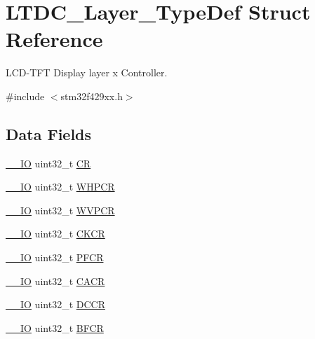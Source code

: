 \hypertarget{struct_l_t_d_c___layer___type_def}{}\section{L\+T\+D\+C\+\_\+\+Layer\+\_\+\+Type\+Def Struct Reference}
\label{struct_l_t_d_c___layer___type_def}


L\+C\+D-\/\+T\+FT Display layer x Controller.  




{\ttfamily \#include $<$stm32f429xx.\+h$>$}

\subsection*{Data Fields}
\begin{DoxyCompactItemize}
\item 
\hyperlink{core__sc300_8h_aec43007d9998a0a0e01faede4133d6be}{\+\_\+\+\_\+\+IO} uint32\+\_\+t \hyperlink{struct_l_t_d_c___layer___type_def_ab40c89c59391aaa9d9a8ec011dd0907a}{CR}
\item 
\hyperlink{core__sc300_8h_aec43007d9998a0a0e01faede4133d6be}{\+\_\+\+\_\+\+IO} uint32\+\_\+t \hyperlink{struct_l_t_d_c___layer___type_def_a36bded5d2b6b499385e45660f4a3c867}{W\+H\+P\+CR}
\item 
\hyperlink{core__sc300_8h_aec43007d9998a0a0e01faede4133d6be}{\+\_\+\+\_\+\+IO} uint32\+\_\+t \hyperlink{struct_l_t_d_c___layer___type_def_aafd5aea090b8ab4f7cbaee88503cb6a1}{W\+V\+P\+CR}
\item 
\hyperlink{core__sc300_8h_aec43007d9998a0a0e01faede4133d6be}{\+\_\+\+\_\+\+IO} uint32\+\_\+t \hyperlink{struct_l_t_d_c___layer___type_def_a7651be3d835a984e908b0abb4a633811}{C\+K\+CR}
\item 
\hyperlink{core__sc300_8h_aec43007d9998a0a0e01faede4133d6be}{\+\_\+\+\_\+\+IO} uint32\+\_\+t \hyperlink{struct_l_t_d_c___layer___type_def_a30f057fd86f8f793b6ab74bbe024b9d8}{P\+F\+CR}
\item 
\hyperlink{core__sc300_8h_aec43007d9998a0a0e01faede4133d6be}{\+\_\+\+\_\+\+IO} uint32\+\_\+t \hyperlink{struct_l_t_d_c___layer___type_def_a47be8b57cf19a433c0682d91a0524463}{C\+A\+CR}
\item 
\hyperlink{core__sc300_8h_aec43007d9998a0a0e01faede4133d6be}{\+\_\+\+\_\+\+IO} uint32\+\_\+t \hyperlink{struct_l_t_d_c___layer___type_def_a8aa219e1455869d3baf87a618586838d}{D\+C\+CR}
\item 
\hyperlink{core__sc300_8h_aec43007d9998a0a0e01faede4133d6be}{\+\_\+\+\_\+\+IO} uint32\+\_\+t \hyperlink{struct_l_t_d_c___layer___type_def_a8a598358c93b94fe534a4ed8aeb05220}{B\+F\+CR}

\end{DoxyCompactItemize}
